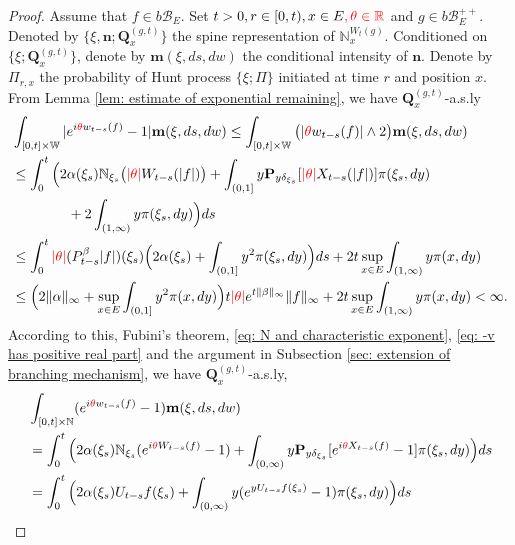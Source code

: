 \documentclass[12pt,oneside,english]{amsart}
\theoremstyle{plain}
\theoremstyle{definition}
\numberwithin{equation}{section}
\begin{document}
\begin{proof}
    Assume that $f\in b\mathscr B_E$.
    Set $t>0, r\in [0,t), x\in E{\color{red}, \theta \in \mathbb R}$ and $g\in b\mathscr B_E^{++}$.
    Denoted by $\{\xi, \mathbf n; \mathbf Q_x^{(g,t)}\}$ the spine representation of $\mathbb N_x^{W_t(g)}$.
    Conditioned on $\{\xi; \mathbf Q_x^{(g,t)}\}$, denote by $\mathbf m(\xi, ds,dw)$ the conditional intensity of $\mathbf n$.
    Denote by $\Pi_{r,x}$ the probability of Hunt process $\{\xi; \Pi\}$ initiated at time $r$ and position $x$.
    From Lemma \ref{lem: estimate of exponential remaining}, we have $\mathbf Q^{(g,t)}_{x}$-a.s.ly
\begin{align}
&\int_{[0,t]\times \mathbb W}|e^{i {\color{red}\theta} w_{t-s}(f)} - 1| \mathbf m(\xi, ds,dw)
    \leq \int_{[0,t]\times \mathbb W}\big(|{\color{red}\theta} w_{t-s}(f)| \wedge 2\big) \mathbf m(\xi, ds,dw)
    \\&\leq \int_0^t \Big(2\alpha(\xi_s)\mathbb N_{\xi_s}\big({\color{red}|\theta |} W_{t-s}(|f|)\big)  + \int_{(0,1]} y \mathbf P_{y \delta_{\xi_s}}[{\color{red}|\theta|} X_{t-s}(|f|)] \pi(\xi_s,dy)
    \\&\qquad\qquad+ 2\int_{(1,\infty)}y\pi(\xi_s,dy)\Big) ds
     \\&\leq \int_0^t {\color{red}|\theta|}(P_{t-s}^\beta |f|)(\xi_s)\Big(2\alpha(\xi_s)  + \int_{(0,1]} y^2 \pi(\xi_s,dy)\Big) ds + 2t \sup_{x\in E}\int_{(1,\infty)}y\pi(x,dy)
    \\&\leq \Big(2\|\alpha\|_\infty +\sup_{x\in E}\int_{(0,1]} y^2 \pi(x,dy)\Big) t {\color{red}|\theta|} e^{t\|\beta\|_\infty}\|f\|_\infty + 2t \sup_{x\in E}\int_{(1,\infty)}y\pi(x,dy)
    < \infty.
\end{align}
    According to this, Fubini's theorem, \eqref{eq: N and characteristic exponent}, \eqref{eq: -v has positive real part} and the argument in Subsection \ref{sec: extension of branching mechanism}, we have $\mathbf Q^{(g,t)}_{x}$-a.s.ly,
\begin{align}
    &\int_{[0,t]\times \mathbb N}(e^{i\deleted{\theta} w_{t-s}(f)} - 1) \mathbf m(\xi, ds,dw)
    \\&=\int_0^t \Big(2\alpha(\xi_s)\mathbb N_{\xi_s}(e^{i\deleted{\theta} W_{t-s}(f)} - 1)  + \int_{(0,\infty)} y \mathbf P_{y \delta_{\xi_s}}[e^{i\deleted{\theta} X_{t-s}(f)} - 1] \pi(\xi_s,dy)\Big) ds
    \\&=\int_0^t \Big( 2\alpha(\xi_s) U_{t-s} f(\xi_s) + \int_{(0,\infty)} y (e^{y U_{t-s}f(\xi_s)} - 1) \pi(\xi_s,dy) \Big) ds

\end{align}
\end{proof}
\end{document}
